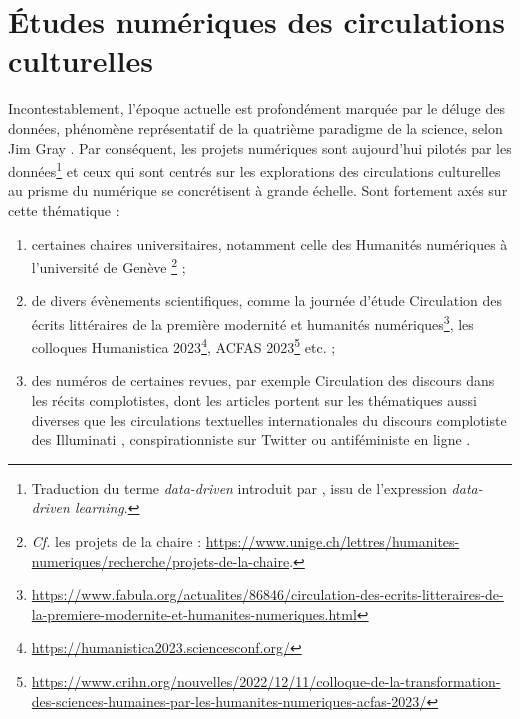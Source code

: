 \section{Études numériques des circulations culturelles}
Incontestablement, l'époque actuelle est profondément marquée par le \og{}déluge des données\fg{}, phénomène représentatif de la quatrième paradigme de la science, selon Jim Gray \citep[p.~30]{hey2009jim}. Par conséquent, les projets numériques sont aujourd'hui \og{}pilotés par les données\fg{}\footnote{Traduction du terme \textit{data-driven} introduit par \citet{Johns1991ShouldYB}, issu de l'expression \textit{data-driven learning}.} et ceux qui sont centrés sur les explorations des circulations culturelles au prisme du numérique se concrétisent à grande échelle.
Sont fortement axés sur cette thématique :
\begin{enumerate}
\item certaines chaires universitaires, notamment celle des Humanités numériques à l'université de Genève \citep{joyeux2022circulations}\footnote{\textit{Cf.} les projets de la chaire : \url{https://www.unige.ch/lettres/humanites-numeriques/recherche/projets-de-la-chaire}.} ;
\item de divers évènements scientifiques, comme la journée d'étude \og{}Circulation des écrits littéraires de la première modernité et humanités numériques\fg{}\footnote{\url{https://www.fabula.org/actualites/86846/circulation-des-ecrits-litteraires-de-la-premiere-modernite-et-humanites-numeriques.html}}, les colloques Humanistica 2023\footnote{\url{https://humanistica2023.sciencesconf.org/}}, \textsc{ACFAS} 2023\footnote{\url{https://www.crihn.org/nouvelles/2022/12/11/colloque-de-la-transformation-des-sciences-humaines-par-les-humanites-numeriques-acfas-2023/}} etc. ;
\item des numéros de certaines revues, par exemple \og{}Circulation des discours dans les récits complotistes\fg{}, dont les articles portent sur les thématiques aussi diverses que les circulations textuelles internationales du discours complotiste des \og Illuminati \fg{}  \citep{chaudet2022illuminati}, \og conspirationniste \fg{} sur Twitter \citep{giry2022etudier} ou antiféministe en ligne \citep{morin2022discours}. 
\end{enumerate}

